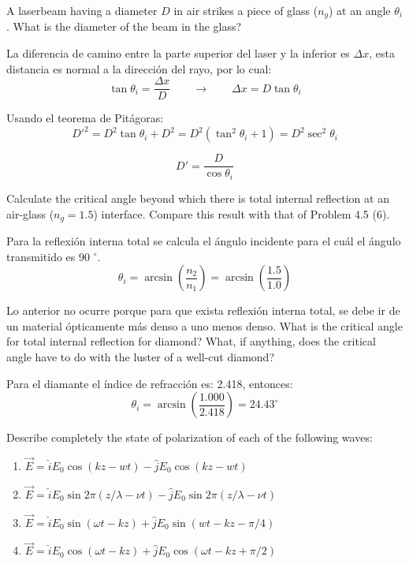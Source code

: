 \documentclass[addpoints,10pt]{exam}
\begin{document}
\begin{questions}
		{	\question
			A laserbeam having a diameter $D$ in air strikes a piece of glass ($n_{g}$) at an angle $\theta_i$. What is the diameter of the beam in the glass?
		}
		
		La diferencia de camino entre la parte superior del laser y la inferior es $\Delta x$, esta distancia es normal a la direcci\'on del rayo, por lo cual:
		\begin{equation}
			\tan\theta_i = \dfrac{\Delta x}{D} \qquad \longrightarrow \qquad \Delta x = D\tan\theta_i
		\end{equation}
		
		Usando el teorema de Pit\'agoras:
		\begin{equation}
			D'^2 = D^2\tan\theta_i + D^2 = D^2\left(\tan^2\theta_i + 1\right) = D^2\sec^2\theta_i
		\end{equation}
		
		\begin{equation}
			D' = \dfrac{D}{\cos\theta_i}
		\end{equation}
		
		{
			\question
			Calculate the critical angle beyond which there is total internal reflection at an air-glass ($n_g = 1.5$) interface. Compare this result with that of Problem 4.5 (6).
		}
		
		Para la reflexi\'on interna total se calcula el \'angulo incidente para el cu\'al el \'angulo transmitido es 90 $^\circ$.
		\begin{equation}
			\theta_i =  \arcsin\left(\dfrac{n_2}{n_1}\right) = \arcsin\left(\dfrac{1.5}{1.0}\right)
		\end{equation}
		
		Lo anterior no ocurre porque para que exista reflexi\'on interna total, se debe ir de un material \'opticamente m\'as denso a uno menos denso.
		{
			\question
			What is the critical angle for total internal reflection for diamond? What, if anything, does the critical angle have to do with the luster of a well-cut diamond?
		}
		
		Para el diamante el \'indice de refracci\'on es: 2.418, entonces:
		\begin{equation}
			\theta_i = \arcsin\left(\dfrac{1.000}{2.418}\right) = 24.43 ^\circ
		\end{equation}

		{
			\question
			Describe completely the state of polarization of each of the following waves:
			\begin{enumerate}
				\item $\vec{E} = \hat{i} E_0\cos(kz-wt) - \hat{j}E_0\cos(kz - wt)$
				\item $\vec{E} = \hat{i}E_0\sin2\pi(z/\lambda - \nu t) - \hat{j}E_0\sin2\pi(z/\lambda - \nu t)$
				\item $\vec{E} = \hat{i}E_0\sin(\omega t -kz) + \hat{j}E_0\sin(wt-kz-\pi/4)$
				\item $\vec{E} = \hat{i}E_0\cos(\omega t - kz) + \hat{j}E_0\cos(\omega t - kz + \pi/2)$
			\end{enumerate}
		}
		

\end{questions}
\end{document}
